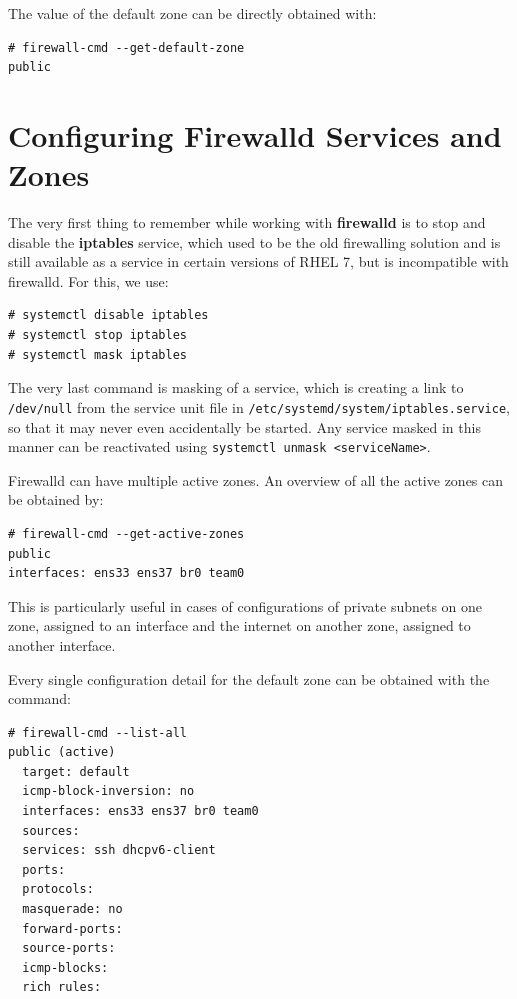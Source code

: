 \noindent
The value of the default zone can be directly obtained with:

\vspace{-15pt}
\begin{verbatim}
# firewall-cmd --get-default-zone 
public
\end{verbatim}

	\section{Configuring Firewalld Services and Zones}
The very first thing to remember while working with \textbf{firewalld} is to stop and disable the \textbf{iptables} service, which used to be the old firewalling solution and is still available as a service in certain versions of RHEL 7, but is incompatible with firewalld. For this, we use:

\vspace{-15pt}
\begin{verbatim}
# systemctl disable iptables
# systemctl stop iptables
# systemctl mask iptables
\end{verbatim}
\vspace{-10pt}	

\noindent
The very last command is masking of a service, which is creating a link to \verb|/dev/null| from the service unit file in \verb|/etc/systemd/system/iptables.service|, so that it may never even accidentally be started. Any service masked in this manner can be reactivated using \verb|systemctl unmask <serviceName>|. 

Firewalld can have multiple active zones. An overview of all the active zones can be obtained by:

\vspace{-15pt}
\begin{verbatim}
# firewall-cmd --get-active-zones 
public
interfaces: ens33 ens37 br0 team0
\end{verbatim}
\vspace{-10pt}	

\noindent
This is particularly useful in cases of configurations of private subnets on one zone, assigned to an interface and the internet on another zone, assigned to another interface. 

Every single configuration detail for the default zone can be obtained with the command:

\vspace{-15pt}
\begin{verbatim}
# firewall-cmd --list-all
public (active)
  target: default
  icmp-block-inversion: no
  interfaces: ens33 ens37 br0 team0
  sources: 
  services: ssh dhcpv6-client
  ports: 
  protocols: 
  masquerade: no
  forward-ports: 
  source-ports: 
  icmp-blocks: 
  rich rules: 
\end{verbatim}
\vspace{-10pt}	

